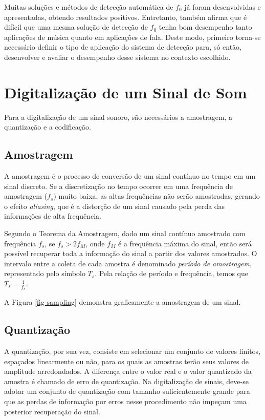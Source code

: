 Muitas soluções e métodos de detecção automática de $f_0$ já foram desenvolvidas e apresentadas, obtendo resultados positivos. Entretanto, \cite{gerhard2003} também afirma que é difícil que uma mesma solução de detecção de $f_0$ tenha bom desempenho tanto aplicações de música quanto em aplicações de fala. Deste modo, primeiro torna-se necessário definir o tipo de aplicação do sistema de detecção para, só então, desenvolver e avaliar o desempenho desse sistema no contexto escolhido.


\section{Digitalização de um Sinal de Som}

Para a digitalização de um sinal sonoro, são necessários a amostragem, a quantização e a codificação. 

\subsection{Amostragem}
A amostragem é o processo de conversão de um sinal contínuo no tempo em um sinal discreto. Se a discretização no tempo ocorrer em uma frequência de amostragem ($f_s$) muito baixa, as altas frequências não serão amostradas, gerando o efeito \textit{aliasing}, que é a distorção de um sinal causado pela perda das informações de alta frequência. 


Segundo o Teorema da Amostragem\cite{lathi2007}, dado um sinal contínuo amostrado com frequência $f_s$, se $f_s > 2f_M$, onde $f_M$ é a frequência máxima do sinal, então será possível recuperar toda a informação do sinal a partir dos valores amostrados. O intervalo entre a coleta de cada amostra é denominado \textit{período de amostragem}, representado pelo símbolo $T_s$. Pela relação de período e frequência, temos que $T_s = \frac{1}{f_s}$.


A Figura \ref{fig-sampling} demonstra graficamente a amostragem de um sinal.


\subsection{Quantização}
A quantização, por sua vez, consiste em selecionar um conjunto de valores finitos, espaçados linearmente ou não, para os quais as amostras terão seus valores de amplitude arredondados. A diferença entre o valor real e o valor quantizado da amostra é chamado de erro de quantização. Na digitalização de sinais, deve-se adotar um conjunto de quantização com tamanho suficientemente grande para que as perdas de informação por erros nesse procedimento não impeçam uma posterior recuperação do sinal.


